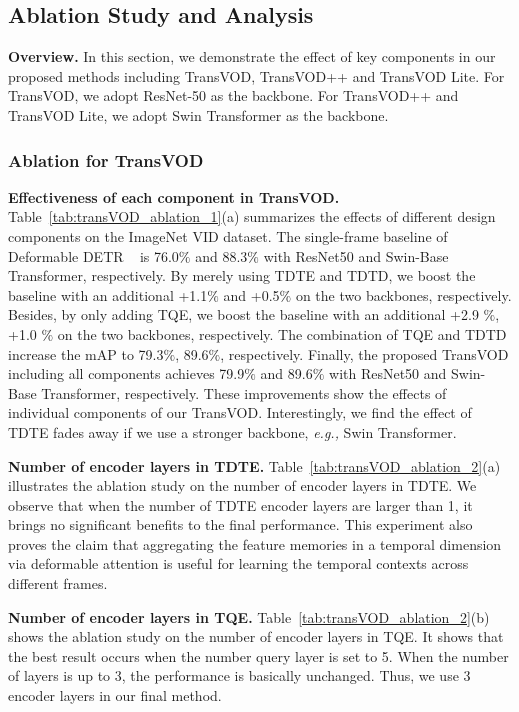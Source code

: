 \documentclass[10pt,journal,compsoc]{IEEEtran}
\begin{document}
\subsection{Ablation Study and Analysis}

\noindent
\textbf{Overview.} In this section, we demonstrate the effect of key components in our proposed methods including TransVOD, TransVOD++ and TransVOD Lite. For TransVOD, we adopt ResNet-50 as the backbone. For TransVOD++ and TransVOD Lite, we adopt Swin Transformer as the backbone. 



\subsubsection{Ablation for TransVOD}

\noindent 
\textbf{Effectiveness of each component in TransVOD.}
Table~\ref{tab:transVOD_ablation_1}(a) summarizes the effects of different design components on the ImageNet VID dataset. 
The single-frame baseline of Deformable DETR ~\cite{zhu2020deformable} is 76.0$\%$ and 88.3$\%$ with ResNet50 and Swin-Base Transformer, respectively. By merely using TDTE and TDTD, we boost the baseline with an additional +1.1$\%$ and +0.5$\%$ on the two backbones, respectively. Besides, by only adding TQE, we boost the baseline with an additional +2.9 $\%$, +1.0 $\%$ on the two backbones, respectively. The combination of TQE and TDTD increase the mAP to 79.3$\%$, 89.6$\%$, respectively. Finally, the proposed TransVOD including all components achieves 79.9$\%$ and 89.6$\%$ with ResNet50 and Swin-Base Transformer, respectively. These improvements show the effects of individual components of our TransVOD. Interestingly, we find the effect of TDTE fades away if we use a stronger backbone, \emph{e.g.,} Swin Transformer. 


\noindent \textbf{Number of encoder layers in TDTE.}
Table~\ref{tab:transVOD_ablation_2}(a) illustrates the ablation study on the number of encoder layers in TDTE. We observe that when the number of TDTE encoder layers are larger than 1, it brings no significant benefits to the final performance. This experiment also proves the claim that aggregating the feature memories in a temporal dimension via deformable attention is useful for learning the temporal contexts across different frames.

\noindent 
\textbf{Number of encoder layers in TQE.}
Table~\ref{tab:transVOD_ablation_2}(b) shows the ablation study on the number of encoder layers in TQE. It shows that the best result occurs when the number query layer is set to 5. When the number of layers is up to 3, the performance is basically unchanged. Thus, we use 3 encoder layers in our final method.
\end{document}
